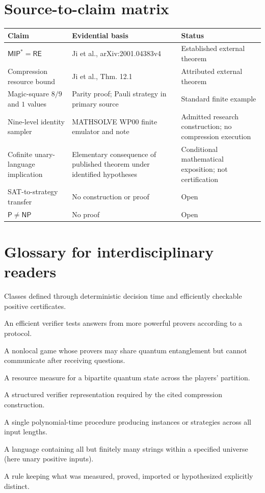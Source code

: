 \documentclass[11pt,a4paper]{article}
\newcommand{\Pclass}{\mathsf{P}}
\newcommand{\NPclass}{\mathsf{NP}}
\newcommand{\RE}{\mathsf{RE}}
\newcommand{\MIP}{\mathsf{MIP}}
\begin{document}
\section{Source-to-claim matrix}
\small
\begin{longtable}{@{}p{.24\linewidth}p{.44\linewidth}p{.26\linewidth}@{}}
\toprule Claim & Evidential basis & Status \\ \midrule\endhead
$\MIP^*=\RE$ & Ji et al., arXiv:2001.04383v4 & Established external theorem \\
Compression resource bound & Ji et al., Thm. 12.1 & Attributed external theorem \\
Magic-square $8/9$ and $1$ values & Parity proof; Pauli strategy in primary source & Standard finite example \\
Nine-level identity sampler & MATHSOLVE WP00 finite emulator and note & Admitted research construction; no compression execution \\
Cofinite unary-language implication & Elementary consequence of published theorem under identified hypotheses & Conditional mathematical exposition; not certification \\
SAT-to-strategy transfer & No construction or proof & Open \\
$\Pclass\ne\NPclass$ & No proof & Open \\
\bottomrule
\end{longtable}
\normalsize

\section{Glossary for interdisciplinary readers}
\begin{description}[leftmargin=2.3cm,labelwidth=2.15cm,style=nextline]
\item[$\Pclass$, $\NPclass$] Classes defined through deterministic decision time and efficiently checkable positive certificates.
\item[Interactive proof] An efficient verifier tests answers from more powerful provers according to a protocol.
\item[Entangled game] A nonlocal game whose provers may share quantum entanglement but cannot communicate after receiving questions.
\item[Schmidt rank] A resource measure for a bipartite quantum state across the players' partition.
\item[Normal form] A structured verifier representation required by the cited compression construction.
\item[Uniform reduction] A single polynomial-time procedure producing instances or strategies across all input lengths.
\item[Cofinite] A language containing all but finitely many strings within a specified universe (here unary positive inputs).
\item[Claim firewall] A rule keeping what was measured, proved, imported or hypothesized explicitly distinct.
\end{description}
\end{document}
